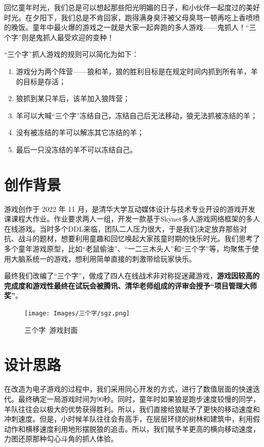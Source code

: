 


回忆童年时光，我们总是可以想起那些阳光明媚的日子，和小伙伴一起度过的美好时光。在夕阳下，我们总是不肯回家，跑得满身臭汗被父母臭骂一顿再吃上香喷喷的晚饭。童年中最火爆的游戏之一就是大家一起奔跑的多人游戏——鬼抓人！“三个字”则是鬼抓人最受欢迎的变种！

“三个字”抓人游戏的规则可以简化为如下：

\begin{enumerate}
    \item 游戏分为两个阵营——狼和羊，狼的胜利目标是在规定时间内抓到所有羊，羊的目标是存活；
    \item 狼抓到某只羊后，该羊加入狼阵营；
    \item 羊可以大喊“三个字”冻结自己，冻结自己后无法移动，狼无法抓被冻结的羊；
    \item 没有被冻结的羊可以解冻其它冻结的羊；
    \item 最后一只没冻结的羊不可以冻结自己。
\end{enumerate}

\section{创作背景}
游戏创作于 2022 年 11 月，是清华大学互动媒体设计与技术专业开设的游戏开发课课程大作业。作业要求两人一组，开发一款基于Skynet多人游戏网络框架的多人在线游戏。当时多个DDL来临，团队二人压力很大，于是我们决定放弃那些对抗、战斗的题材，想要利用童趣和回忆唤起大家孩童时期的快乐时光。我们思考了多个童年游戏原型，比如“老鼠偷油”、“一二三木头人”和“三个字”等，均聚焦于使用大脑系统一的游戏，想利用简单直接的刺激带给玩家快乐。

最终我们改编了“三个字”，做成了四人在线战术非对称捉迷藏游戏，\textbf{游戏因较高的完成度和游戏性最终在试玩会被腾讯、清华老师组成的评审会授予“项目管理大师奖”}。

\begin{figure}[H]
    \centering
    \texttt{[image: Images/三个字/sgz.png]}
    \caption{三个字\ 游戏封面}
\end{figure}

\section{设计思路}
在改造为电子游戏的过程中，我们采用同心开发的方式，进行了数值层面的快速迭代。最终确定一局游戏时间为90秒。同时，童年时如果狼是跑步速度较慢的同学，羊队往往会以极大的优势获得胜利。所以，我们直接给狼赋予了更快的移动速度和冲刺速度。但是，小时候羊队往往会有高手，在层层环绕的树林和建筑中，利用假动作和横移速度利用地形摆脱狼的追击。所以，我们赋予羊更高的横向移动速度，力图还原那种勾心斗角的抓人体验。

